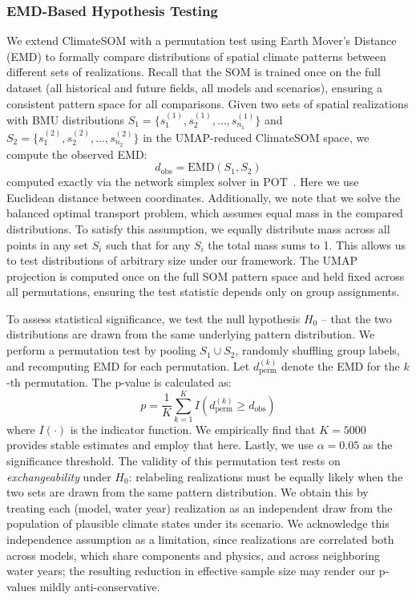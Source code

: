 \subsubsection{EMD-Based Hypothesis Testing}
We extend ClimateSOM with a permutation test using Earth Mover's Distance (EMD) to formally compare distributions of spatial climate patterns between different sets of realizations.
%
Recall that the SOM is trained once on the full dataset (all historical and future fields, all models and scenarios), ensuring a consistent pattern space for all comparisons.
%
Given two sets of spatial realizations with BMU distributions $S_1 = \{s_1^{(1)}, s_2^{(1)}, \ldots, s_{n_1}^{(1)}\}$ and $S_2 = \{s_1^{(2)}, s_2^{(2)}, \ldots, s_{n_2}^{(2)}\}$ in the UMAP-reduced ClimateSOM space, we compute the observed EMD:
\begin{equation}
d_{\text{obs}} = \text{EMD}(S_1, S_2)
\end{equation}
computed exactly via the network simplex solver in POT~\cite{flamary2021pot}. 
%
Here we use Euclidean distance between coordinates.
%
Additionally, we note that we solve the balanced optimal transport problem, which assumes equal mass in the compared distributions.
%
To satisfy this assumption, we equally distribute mass across all points in any set $S_i$ such that for any $S_i$ the total mass sums to 1.
%
This allows us to test distributions of arbitrary size under our framework.
%
The UMAP projection is computed once on the full SOM pattern space and held fixed across all permutations, ensuring the test statistic depends only on group assignments. 

To assess statistical significance, we test the null hypothesis $H_0$ -- that the two distributions are drawn from the same underlying pattern distribution.
%
We perform a permutation test by pooling $S_1 \cup S_2$, randomly shuffling group labels, and recomputing EMD for each permutation.
%
Let $d_{\text{perm}}^{(k)}$ denote the EMD for the $k$-th permutation.
%
The p-value is calculated as:
\begin{equation}
p = \frac{1}{K} \sum_{k=1}^{K} I(d_{\text{perm}}^{(k)} \geq d_{\text{obs}})
\end{equation}
where $I(\cdot)$ is the indicator function.
%
We empirically find that $K=5000$ provides stable estimates and employ that here.
%
Lastly, we use $\alpha = 0.05$ as the significance threshold.
%
The validity of this permutation test rests on \emph{exchangeability} under $H_0$: relabeling realizations must be equally likely when the two sets are drawn from the same pattern distribution. We obtain this by treating each (model, water year) realization as an independent draw from the population of plausible climate states under its scenario. We acknowledge this independence assumption as a limitation, since realizations are correlated both across models, which share components and physics, and across neighboring water years; the resulting reduction in effective sample size may render our p-values mildly anti-conservative.

